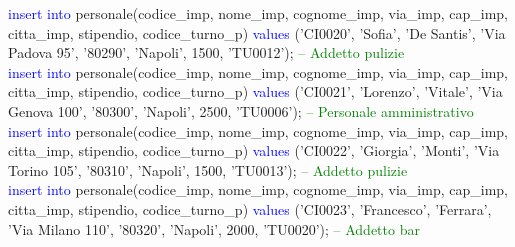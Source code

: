\documentclass{article}
\begin{document}
\begin{flushleft}
{        \vspace{2mm}
        \hspace*{0.5em}\textcolor{blue}{insert into} personale(codice\_imp, nome\_imp, cognome\_imp, via\_imp, cap\_imp, \hspace*{0.5em}citta\_imp, stipendio, codice\_turno\_p) \textcolor{blue}{values} ('CI0020', 'Sofia', 'De Santis', \hspace*{0.5em}'Via Padova 95', \hspace*{0.5em}'80290', 'Napoli', 1500, 'TU0012'); \hspace*{0.5em} \textcolor{green}{-- Addetto pulizie} \\
        \vspace{2mm}
        \hspace*{0.5em}\textcolor{blue}{insert into} personale(codice\_imp, nome\_imp, cognome\_imp, via\_imp, cap\_imp, \hspace*{0.5em}citta\_imp, stipendio, codice\_turno\_p) \textcolor{blue}{values} ('CI0021', 'Lorenzo', 'Vitale', 'Via \hspace*{0.5em}Genova 100', \hspace*{0.5em}'80300', 'Napoli', 2500, 'TU0006'); \hspace*{0.5em} \textcolor{green}{-- Personale amministrativo} \\
        \vspace{2mm}
        \hspace*{0.5em}\textcolor{blue}{insert into} personale(codice\_imp, nome\_imp, cognome\_imp, via\_imp, cap\_imp, \hspace*{0.5em}citta\_imp, stipendio, codice\_turno\_p) \textcolor{blue}{values} ('CI0022', 'Giorgia', 'Monti', 'Via \hspace*{0.5em}Torino 105', \hspace*{0.5em}'80310', 'Napoli', 1500, 'TU0013'); \hspace*{0.5em} \textcolor{green}{-- Addetto pulizie} \\
        \vspace{2mm}
        \hspace*{0.5em}\textcolor{blue}{insert into} personale(codice\_imp, nome\_imp, cognome\_imp, via\_imp, cap\_imp, \hspace*{0.5em}citta\_imp, stipendio, codice\_turno\_p) \textcolor{blue}{values} ('CI0023', 'Francesco', 'Ferrara', \hspace*{0.5em}'Via Milano \hspace*{0.5em}110', '80320', 'Napoli', 2000, 'TU0020'); \hspace*{0.5em} \textcolor{green}{-- Addetto bar} \\
}
\end{flushleft}
\end{document}
